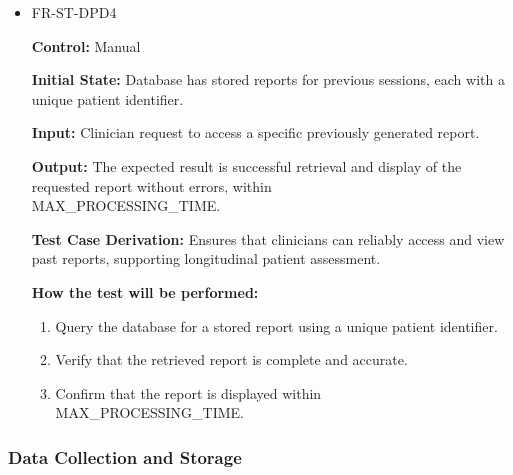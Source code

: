 \documentclass[12pt, titlepage]{article}
\begin{document}
\begin{itemize}
  \item FR-ST-DPD4
  \begin{mdframed}[linewidth=0.5mm]
      \textbf{Control:} Manual \par
      \textbf{Initial State:} Database has stored reports for previous sessions, each with a unique patient identifier. \par
      \textbf{Input:} Clinician request to access a specific previously generated report. \par
      \textbf{Output:} The expected result is successful retrieval and display of the requested report without errors, within \\MAX\_PROCESSING\_TIME. \par
      \textbf{Test Case Derivation:} Ensures that clinicians can reliably access and view past reports, supporting longitudinal patient assessment.\par
      \textbf{How the test will be performed:}
      \begin{enumerate}[noitemsep]
        \item Query the database for a stored report using a unique patient identifier. 
        \item Verify that the retrieved report is complete and accurate. 
        \item Confirm that the report is displayed within \\MAX\_PROCESSING\_TIME.
      \end{enumerate}
  \end{mdframed}

\end{itemize}

\subsubsection{Data Collection and Storage}
\end{document}
